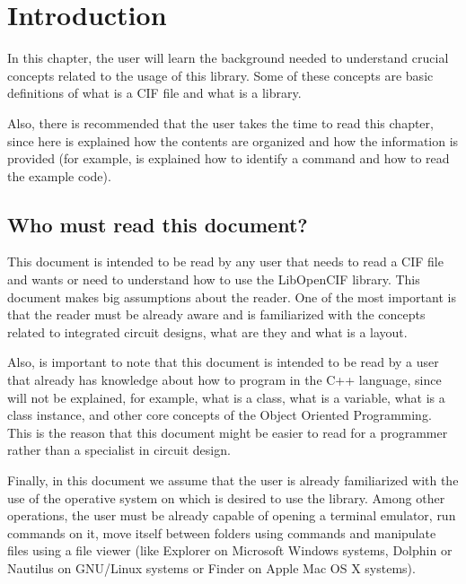 \documentclass[11pt,twoside,openany,x11names,svgnames]{memoir}
\newcommand\chapterillustration{}
\begin{document}

\setcounter{secnumdepth}{2}

\renewcommand\chapterillustration{images/chapter01-cover}
\renewcommand{\chaptername}{Chapter}
\renewcommand{\figurename}{Figure}

\chapter{Introduction}\label{Introduction}

In this chapter, the user will learn the background needed to understand crucial concepts related to the usage of this library. Some of these concepts are basic definitions of what is a CIF file and what is a library.

Also, there is recommended that the user takes the time to read this chapter, since here is explained how the contents are organized and how the information is provided (for example, is explained how to identify a command and how to read the example code).
\newpage 

\section{Who must read this document?}\label{Who-must-read-this-document}

This document is intended to be read by any user that needs to read a CIF file and wants or need to understand how to use the LibOpenCIF library. This document makes big assumptions about the reader. One of the most important is that the reader must be already aware and is familiarized with the concepts related to integrated circuit designs, what are they and what is a layout.

Also, is important to note that this document is intended to be read by a user that already has knowledge about how to program in the C++ language, since will not be explained, for example, what is a class, what is a variable, what is a class instance, and other core concepts of the Object Oriented Programming. This is the reason that this document might be easier to read for a programmer rather than a specialist in circuit design.

Finally, in this document we assume that the user is already familiarized with the use of the operative system on which is desired to use the library. Among other operations, the user must be already capable of opening a terminal emulator, run commands on it, move itself between folders using commands and manipulate files using a file viewer (like Explorer on Microsoft Windows systems, Dolphin or Nautilus on GNU/Linux systems or Finder on Apple Mac OS X systems).
\end{document}
